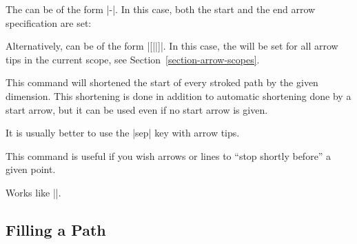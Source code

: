 \begin{command}{\pgfsetarrows{}}
    The  can be of the form |-|. In this case, both the
    start and the end arrow specification are set:
\begin{codeexample}[preamble={\usepgflibrary{arrows.meta}}]
\begin{pgfpicture}
  \pgfpathmoveto{\pgfpointorigin}
  \pgfpathlineto{\pgfpoint{1cm}{0cm}}
\end{pgfpicture}
\end{codeexample}
    Alternatively,  can be of the form |[||]|.
    In this case, the  will be set for all arrow tips in the
    current scope, see Section~\ref{section-arrow-scopes}.
\end{command}

\begin{command}{\pgfsetshortenstart{}}
    This command will shortened the start of every stroked path by the given
    dimension. This shortening is done in addition to automatic shortening done
    by a start arrow, but it can be used even if no start arrow is given.

    It is usually better to use the |sep| key with arrow tips.

    This command is useful if you wish arrows or lines to ``stop shortly
    before'' a given point.
\begin{codeexample}[preamble={\usepgflibrary{arrows.meta}}]
\begin{pgfpicture}
  \pgfpathcircle{\pgfpointorigin}{5mm}
  \pgfsetshortenstart{4pt}
  \pgfpathmoveto{\pgfpoint{5mm}{0cm}} %
  \pgfpathlineto{\pgfpoint{2cm}{0cm}}
\end{pgfpicture}
\end{codeexample}
\end{command}

\begin{command}{\pgfsetshortenend{}}
    Works like |\pgfsetshortenstart|.
\end{command}


\subsection{Filling a Path}
\label{section-fill}

